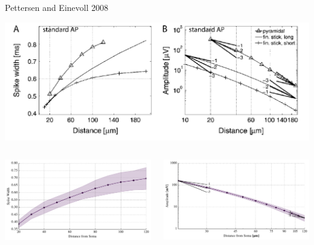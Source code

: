 \documentclass[aspectratio=169]{beamer}
\begin{document}
\begin{frame}{Pettersen and Einevoll 2008}
    \begin{center}
        \includegraphics[width=.6\textwidth]{images/pettersen_einevoll.png}
    \end{center}
    \begin{columns}
        \begin{column}{0.48\textwidth}
                \includegraphics[width=\textwidth]{images/disc_spike_width_II.pdf}
        \end{column}
        \begin{column}{0.48\textwidth}
            \vspace{-1em}
            \begin{center}
                \includegraphics[width=\textwidth]{images/disc_spike_amps_I_log.pdf}
            \end{center}
        \end{column}
    \end{columns}
\end{frame}
\end{document}
